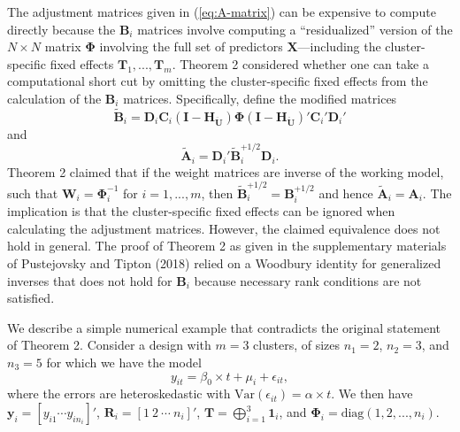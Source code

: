 \documentclass[12pt]{article}
\begin{document}
The adjustment matrices given in (\ref{eq:A-matrix}) can be expensive to
compute directly because the \(\mathbf{B}_i\) matrices involve computing
a ``residualized'' version of the \(N \times N\) matrix
\(\boldsymbol\Phi\) involving the full set of predictors
\(\mathbf{X}\)---including the cluster-specific fixed effects
\(\mathbf{T}_1,...,\mathbf{T}_m\). Theorem 2 considered whether one can
take a computational short cut by omitting the cluster-specific fixed
effects from the calculation of the \(\mathbf{B}_i\) matrices.
Specifically, define the modified matrices \begin{equation}
\label{eq:B-modified}
\mathbf{\tilde{B}}_i = \mathbf{D}_i \mathbf{C}_i \left(\mathbf{I} - \mathbf{H}_{\mathbf{\ddot{U}}}\right) \boldsymbol\Phi \left(\mathbf{I} - \mathbf{H}_{\mathbf{\ddot{U}}}\right)'\mathbf{C}_i' \mathbf{D}_i'
\end{equation} and \begin{equation}
\label{eq:A-modified}
\mathbf{\tilde{A}}_i = \mathbf{D}_i' \mathbf{\tilde{B}}_i^{+1/2} \mathbf{D}_i.
\end{equation} Theorem 2 claimed that if the weight matrices are inverse
of the working model, such that
\(\mathbf{W}_i = \boldsymbol\Phi_i^{-1}\) for \(i = 1,...,m\), then
\(\mathbf{\tilde{B}}_i^{+1/2} = \mathbf{B}_i^{+1/2}\) and hence
\(\mathbf{\tilde{A}}_i = \mathbf{A}_i\). The implication is that the
cluster-specific fixed effects can be ignored when calculating the
adjustment matrices. However, the claimed equivalence does not hold in
general. The proof of Theorem 2 as given in the supplementary materials
of Pustejovsky and Tipton (2018) relied on a Woodbury identity for
generalized inverses that does not hold for \(\mathbf{B}_i\) because
necessary rank conditions are not satisfied.

We describe a simple numerical example that contradicts the original
statement of Theorem 2. Consider a design with \(m = 3\) clusters, of
sizes \(n_1 = 2\), \(n_2 = 3\), and \(n_3 = 5\) for which we have the
model \[
y_{it} = \beta_0 \times t + \mu_i + \epsilon_{it},
\] where the errors are heteroskedastic with
\(\text{Var}(\epsilon_{it}) = \alpha \times t\). We then have
\(\mathbf{y}_i = \left[ y_{i1} \cdots y_{in_i}\right]'\),
\(\mathbf{R}_i = \left[1 \ 2 \ \cdots \ n_i\right]'\),
\(\mathbf{T} = \bigoplus_{i=1}^3 \mathbf{1}_i\), and
\(\boldsymbol\Phi_i = \text{diag}(1,2,...,n_i)\).
\end{document}
